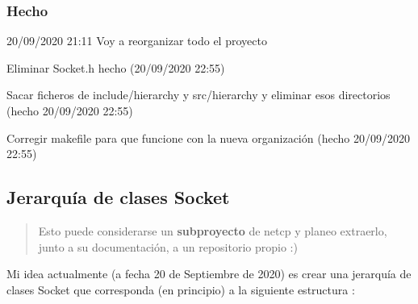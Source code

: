 \subsubsection*{Hecho}


\begin{DoxyItemize}
\item 20/09/2020 21\+:11 Voy a reorganizar todo el proyecto
\begin{DoxyItemize}
\item Eliminar Socket.\+h hecho (20/09/2020 22\+:55)
\item Sacar ficheros de include/hierarchy y src/hierarchy y eliminar esos directorios (hecho 20/09/2020 22\+:55)
\item Corregir makefile para que funcione con la nueva organización (hecho 20/09/2020 22\+:55)
\end{DoxyItemize}
\end{DoxyItemize}

\subsection*{Jerarquía de clases Socket}

\begin{quote}
Esto puede considerarse un {\bfseries subproyecto} de {\ttfamily netcp} y planeo extraerlo, junto a su documentación, a un repositorio propio \+:)~\newline
~\newline
 \end{quote}
Mi idea actualmente (a fecha 20 de Septiembre de 2020) es crear una jerarquía de clases Socket que corresponda (en principio) a la siguiente estructura \+:


